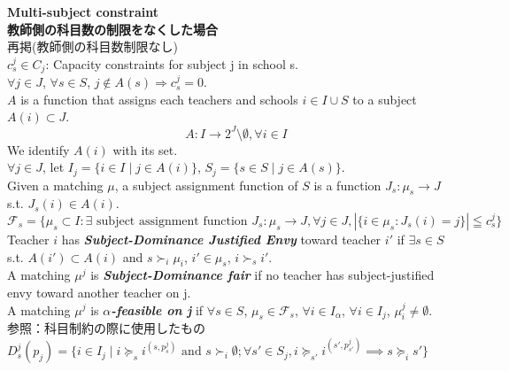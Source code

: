 \documentclass[a4j,10pt]{jsarticle}
\theoremstyle{definition}
\theoremstyle{remark}
\theoremstyle{plain}
\begin{document}
\begin{tcolorbox}[enhanced,breakable=true]
  \textbf{Multi-subject constraint}\\
  \textbf{教師側の科目数の制限をなくした場合}\\
再掲(教師側の科目数制限なし)\\
$c^j_s \in C_j$: Capacity constraints for subject j in school s.\\
$\forall j \in J$, $\forall s \in S$, $j \notin A(s) \Rightarrow c^j_s =0$.\\
$A$ is a function that assigns each teachers and schools $i \in I \cup S$ to a subject $A(i) \subset J$.
\[
\quad A: I \to 2^J\setminus {\emptyset}, \forall i \in I
\]
We identify  $A(i)$ with its set.\\
$\forall j \in J$, let $I_j = \{i \in I \mid j \in A(i)\}$, $S_j = \{s \in S \mid j \in A(s)\}$.\\
Given a matching $\mu$, a subject assignment function of $S$ is a function $J_s : \mu_s \rightarrow J$ s.t. $J_s(i) \in A(i)$.\\
$\mathcal{F}_s =\{\mu_s \subset I : \exists \text{ subject assignment function } J_s:\mu_s \rightarrow J, \forall j \in J, |\{i \in \mu_s : J_s(i)= j\}| \leqq c_s^j\}$\\

Teacher $i$ has {\bf \emph{Subject-Dominance Justified Envy}} toward teacher $i'$ if $\exists s \in S $ s.t. $A(i')\subset A(i)$ and $s \succ_i \mu_i$, $i' \in \mu_s$, $i \succ_s i'$.\\
A matching $\mu^j$ is {\bf \emph{Subject-Dominance fair}} if no teacher has subject-justified envy toward another teacher on j.\\
A matching $\mu^j$ is {\bf \emph{$\alpha$-feasible on j}} if $\forall s \in S$, $\mu_s \in \mathcal{F}_s$, $\forall i \in I_\alpha$, $\forall i \in I_j$, $\mu^j_i \neq \emptyset$.\\

参照：科目制約の際に使用したもの\\

$D^j_s(p_j) = \{ i \in I_j \mid i \succeq_s i^{(s,p^j_s)} \text{ and } s \succ_i \emptyset; \forall s' \in S_j, i \succeq_{s'} i^{(s',p^j_{s'})} \implies s \succeq_i s' \}$\\


\end{tcolorbox}
\end{document}

